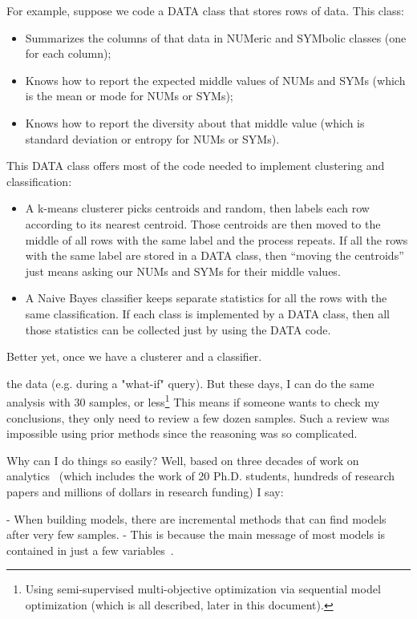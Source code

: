 \documentclass[landscape,	DIV=calc,%
							paper=letter,%
							fontsize=10pt,%
							twocolumn]{scrartcl}	 					%
\begin{document}
For example, suppose we code a  DATA class that stores rows of data.
This class:
\begin{itemize}
    \item
Summarizes the columns of that data  in   NUMeric and  SYMbolic
classes
(one for each column);
\item Knows how to report the expected middle values of NUMs and SYMs
    (which is the mean or mode  for NUMs or SYMs);
\item Knows how to report the
diversity about that middle value (which is standard deviation or entropy for
NUMs or SYMs).
\end{itemize}
This DATA class offers most of the code needed to implement  clustering  and  classification:
\begin{itemize}
    \item
        A k-means clusterer picks centroids and random, then labels each row according to 
        its nearest centroid. Those centroids are then moved to the middle of all rows with the same label and
        the process repeats. If all the rows with the same label are stored in  a DATA class, then ``moving the centroids''
        just means asking our NUMs and SYMs for their middle values.
\item A Naive Bayes classifier keeps separate statistics for all the rows with the same classification.
    If each class is implemented by a DATA class, then all those statistics can be collected just by using the DATA code.
\end{itemize} 
Better yet, 
once we have a clusterer and a classifier.


 
the data (e.g. during a "what-if" query).  But these days, I can
do the same analysis with 30 samples, or 
less\footnote{Using semi-supervised multi-objective optimization via
sequential model optimization (which is all described, later in
this document).} 
This means
if someone wants to check my conclusions, they only need to review
a few dozen samples.  Such a review was impossible using prior
methods since the reasoning was so complicated.


Why can I do things so easily? Well,  based on three decades of work
on analytics~\cite{menzies1988combining} (which includes the work of 20 Ph.D. students,
hundreds of research papers and millions of dollars in research
funding) I say:

- When building models, there are incremental methods that can find
models after very few samples.
- This is because the main message of most models is contained in
just a few variables~\cite{menzies1988combining}.
\end{document}
